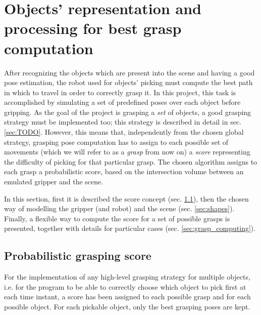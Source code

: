 \section{Objects' representation and processing for best grasp computation}
After recognizing the objects which are present into the scene and having a
good pose estimation, the robot used for objects' picking must compute the best path
in which to travel in order to correctly grasp it. In this project, this task
is accomplished by simulating a set of predefined poses over each object before
gripping. As the goal of the project is grasping a \emph{set} of objects, a
good grasping strategy must be implemented too; this strategy is described in
detail in sec. \ref{sec:TODO}. However, this means that, independently from the
chosen global strategy, grasping pose computation has to assign to each
possible set of movements (which we will refer to as a \emph{grasp} from now on)
a \emph{score} representing the difficulty of picking
for that particular grasp. The chosen algorithm assigns to each grasp a
probabilistic score, based on the intersection volume between an emulated
gripper and the scene.

In this section, first it is described the score concept (sec.
\ref{sec:grasp_score}), then the chosen way of modelling the gripper (and robot) and
the scene (sec. \ref{sec:shapes}). Finally, a flexible way to compute the score for a set of possible
grasps is presented, together with details for particular cases (sec.
\ref{sec:grasp_computing}).

\subsection{Probabilistic grasping score} \label{sec:grasp_score}
For the implementation of any high-level grasping strategy for multiple
objects, i.e. for the program to be able to correctly choose which object to
pick first at each time instant, a score has been assigned to each possible
grasp and for each possible object. For each pickable object, only the best
grasping poses are kept.

